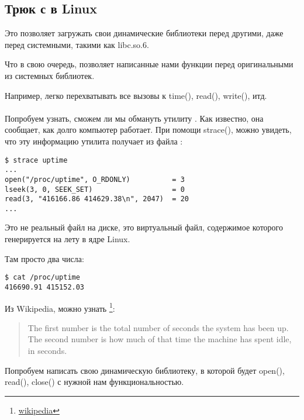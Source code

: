 \subsection{Трюк с  в Linux}

\label{ld_preload}

Это позволяет загружать свои динамические библиотеки перед другими, даже перед системными, такими как libc.so.6.

Что в свою очередь, позволяет  написанные нами функции перед оригинальными из системных библиотек.

Например, легко перехватывать все вызовы к time(), read(), write(), итд. \\
\\
Попробуем узнать, сможем ли мы обмануть утилиту .
Как известно, она сообщает, как долго компьютер работает.
При помощи strace(), можно увидеть, что эту информацию утилита получает из файла :

\begin{lstlisting}
$ strace uptime 
...
open("/proc/uptime", O_RDONLY)          = 3
lseek(3, 0, SEEK_SET)                   = 0
read(3, "416166.86 414629.38\n", 2047)  = 20
...
\end{lstlisting}

Это не реальный файл на диске, это виртуальный файл, содержимое которого генерируется на лету в ядре Linux.

Там просто два числа:

\begin{lstlisting}
$ cat /proc/uptime
416690.91 415152.03
\end{lstlisting}

Из Wikipedia, можно узнать
\footnote{\href{http://go.yurichev.com/17043}{wikipedia}}:

\begin{framed}
\begin{quotation}
The first number is the total number of seconds the system has been up.
The second number is how much of that time the machine has spent idle, in seconds.
\end{quotation}
\end{framed}

Попробуем написать свою динамическую библиотеку, в которой будет open(), read(), close() с нужной нам функциональностью.

